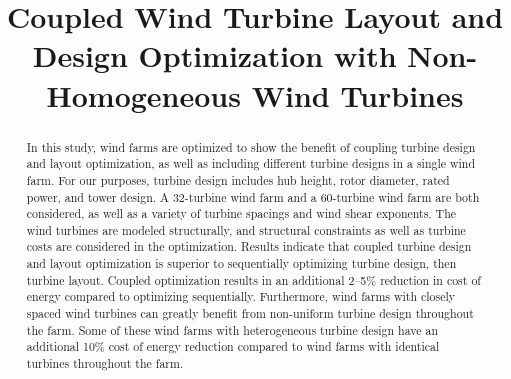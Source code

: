 \documentclass[wes, manuscript]{copernicus}
\begin{document}
\title{Coupled Wind Turbine Layout and Design Optimization with Non-Homogeneous Wind Turbines}











\received{}
\pubdiscuss{} %
\revised{}
\accepted{}
\published{}




\maketitle



\begin{abstract}
In this study, wind farms are optimized to show the benefit of coupling turbine design and layout optimization, as well as including different turbine designs in a single wind farm. For our purposes, turbine design includes hub height, rotor diameter, rated power, and tower design. A 32-turbine wind farm and a 60-turbine wind farm are both considered, as well as a variety of turbine spacings and wind shear exponents. The wind turbines are modeled structurally, and structural constraints as well as turbine costs are considered in the optimization. Results indicate that coupled turbine design and layout optimization is superior to sequentially optimizing turbine design, then turbine layout. Coupled optimization results in an additional  2--5\% reduction in cost of energy compared to optimizing sequentially. Furthermore, wind farms with closely spaced wind turbines can greatly benefit from non-uniform turbine design throughout the farm. Some of these wind farms with heterogeneous turbine design have an additional 10\% cost of energy reduction compared to wind farms with identical turbines throughout the farm.
\end{abstract}
\end{document}
